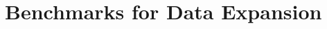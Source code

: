 
\begin{CJK}{UTF8}{gbsn}


\clearpage
\hypertarget{benchmark}{}
\section{Benchmarks for Data Expansion }
\label{Sec: Benchmark List}

%
%

\end{CJK}
